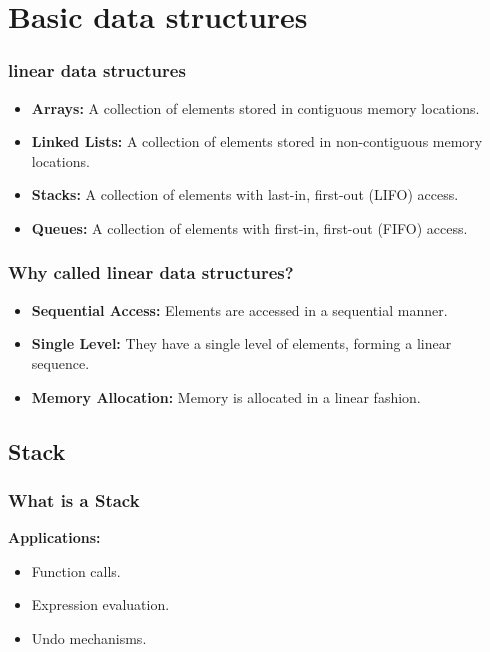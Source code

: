 \section{Basic data structures}
\label{sec:basic-data-structures}

\begin{frame}
    \frametitle{linear data structures}
    \begin{itemize}
        \item \textbf{Arrays:} A collection of elements stored in contiguous memory locations.
        \item \textbf{Linked Lists:} A collection of elements stored in non-contiguous memory locations.
        \item \textbf{Stacks:} A collection of elements with last-in, first-out (LIFO) access.
        \item \textbf{Queues:} A collection of elements with first-in, first-out (FIFO) access.
    \end{itemize}
\end{frame} 

\begin{frame}
    \frametitle{Why called linear data structures?}
    \begin{itemize}
        \item \textbf{Sequential Access:} Elements are accessed in a sequential manner.
        \item \textbf{Single Level:} They have a single level of elements, forming a linear sequence.
        \item \textbf{Memory Allocation:} Memory is allocated in a linear fashion.
    \end{itemize}
\end{frame}
\subsection{Stack}
\begin{frame}
\frametitle{What is a Stack}
    \item \textbf{Applications:}
        \begin{itemize}
            \item Function calls.
            \item Expression evaluation.
            \item Undo mechanisms.
        \end{itemize}
\end{frame}

